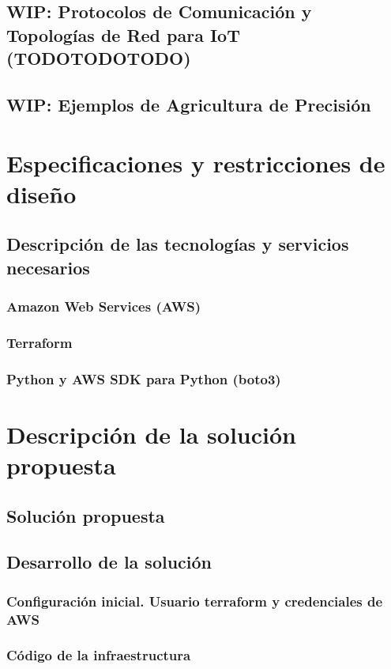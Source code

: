 \documentclass[12pt]{article}
\begin{document}
\subsection{WIP: Protocolos de Comunicación y Topologías de Red para IoT (TODOTODOTODO)}
\subsection{WIP: Ejemplos de Agricultura de Precisión}

\section{Especificaciones y restricciones de diseño}
\subsection{Descripción de las tecnologías y servicios necesarios}
\subsubsection{Amazon Web Services (AWS)}
\subsubsection{Terraform}
\subsubsection{Python y AWS SDK para Python (boto3)}


\section{Descripción de la solución propuesta}
\subsection{Solución propuesta}
\subsection{Desarrollo de la solución}
\subsubsection{Configuración inicial. Usuario terraform y credenciales de AWS}
\subsubsection{Código de la infraestructura}
\end{document}
